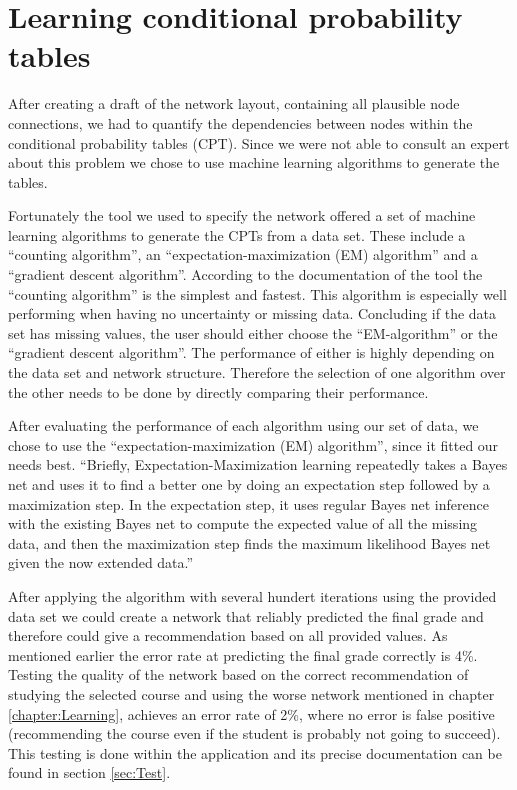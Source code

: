 \documentclass[%
	pdftex,
	oneside,        %
	11pt,           %
	parskip=half,   %
	headsepline,    %
	footsepline,    %
	abstracton,     %
	USenglish,      %
	a4paper,        %
]{report}
\begin{document}
\chapter{Learning conditional probability tables}
\label{chapter:Learning}
After creating a draft of the network layout, containing all plausible node connections, we had to quantify the dependencies between nodes within the conditional probability tables (CPT). Since we were not able to consult an expert about this problem we chose to use machine learning algorithms to generate the tables.

Fortunately the tool we used to specify the network offered a set of machine learning algorithms to generate the CPTs from a data set. These include a \enquote{counting algorithm}, an \enquote{expectation-maximization (EM) algorithm} and a \enquote{gradient descent algorithm}. According to the documentation of the tool the \enquote{counting algorithm} is the simplest and fastest. This algorithm is especially well performing when having no uncertainty or missing data. Concluding if the data set has missing values, the user should either choose the \enquote{EM-algorithm} or the \enquote{gradient descent algorithm}. The performance of either is highly depending on the data set and network structure. Therefore the selection of one algorithm over the other needs to be done by directly comparing their performance. \cite[p. 47]{Corp.:2010aa} 

After evaluating the performance of each algorithm using our set of data, we chose to use the \enquote{expectation-maximization (EM) algorithm}, since it fitted our needs best. \enquote{Briefly, Expectation-Maximization learning repeatedly takes a Bayes net and uses it to find a better one by doing an expectation step followed by a maximization step. In the expectation step, it uses regular Bayes net inference with the existing Bayes net to compute the expected value of all the missing data, and then the maximization step finds the maximum likelihood Bayes net given the now extended data.} \cite[p. 48]{Corp.:2010aa}

After applying the algorithm with several hundert iterations using the provided data set we could create a network that reliably predicted the final grade and therefore could give a recommendation based on all provided values. As mentioned earlier the error rate at predicting the final grade correctly is 4\%. Testing the quality of the network based on the correct recommendation of studying the selected course and using the worse network mentioned in chapter \vref{chapter:Learning}, achieves an error rate of 2\%, where no error is false positive (recommending the course even if the student is probably not going to succeed). This testing is done within the application and its precise documentation can be found in section \vref{sec:Test}.
\end{document}
